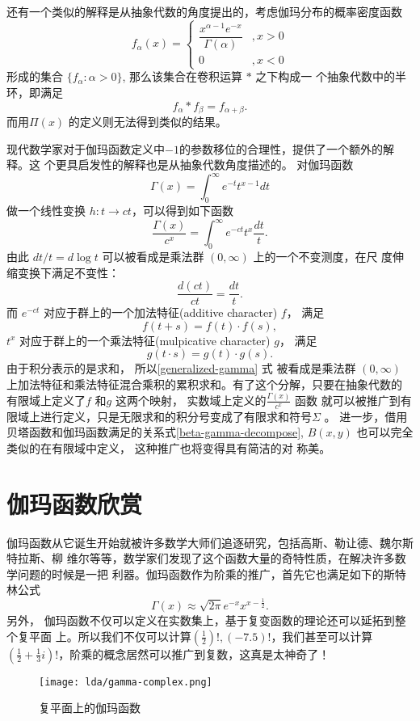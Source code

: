 {还有一个类似的解释是从抽象代数的角度提出的，考虑伽玛分布的概率密度函数
$$ f_\alpha(x)=\begin{cases} \dfrac{x^{\alpha-1} e^{-x}}{\Gamma(\alpha)} 
& , x>0 \\[12pt] 0 & , x<0 \end{cases} $$
形成的集合 $\{f_\alpha : \alpha > 0\}$, 那么该集合在卷积运算 $*$ 之下构成一
个抽象代数中的半环，即满足
$$ f_\alpha * f_\beta = f_{\alpha+\beta} .$$
而用$\Pi(x)$ 的定义则无法得到类似的结果。 


现代数学家对于伽玛函数定义中$-1$的参数移位的合理性，提供了一个额外的解释。这
个更具启发性的解释也是从抽象代数角度描述的。 对伽玛函数
$$ \Gamma(x) = \int_0^{\infty} e^{-t}t^{x-1}dt $$
做一个线性变换 $h: t \rightarrow ct$，可以得到如下函数
\begin{equation}
\label{generalized-gamma}
\frac{\Gamma(x)}{c^x}  = \int_0^{\infty} e^{-ct} t^x \frac{dt}{t} . 
\end{equation}
由此 $dt/t = d \log t$ 可以被看成是乘法群 $(0, \infty)$ 上的一个不变测度，在尺
度伸缩变换下满足不变性：
$$ \frac{d(ct)}{ct} = \frac{dt}{t} .$$
而 $e^{-ct}$ 对应于群上的一个加法特征(additive character) $f$， 满足 
$$f(t+s) =f(t) \cdot f(s) ,$$ 
$t^x$ 对应于群上的一个乘法特征(mulpicative character) $g$， 满足
$$g(t \cdot s) = g(t) \cdot g(s) .$$
由于积分表示的是求和， 所以\eqref{generalized-gamma} 式 被看成是乘法群 $(0,
\infty)$ 上加法特征和乘法特征混合乘积的累积求和。有了这个分解，只要在抽象代数的
有限域上定义了$f$ 和$g$ 这两个映射， 实数域上定义的$\frac{\Gamma(x)}{c^x}$ 函数
就可以被推广到有限域上进行定义，只是无限求和的积分号变成了有限求和符号$\Sigma$
。 进一步，借用贝塔函数和伽玛函数满足的关系式\eqref{beta-gamma-decompose},
$B(x,y)$ 也可以完全类似的在有限域中定义， 这种推广也将变得具有简洁的对
称美。


\section{伽玛函数欣赏}

伽玛函数从它诞生开始就被许多数学大师们追逐研究，包括高斯、勒让德、魏尔斯特拉斯、柳
维尔等等，数学家们发现了这个函数大量的奇特性质，在解决许多数学问题的时候是一把
利器。伽玛函数作为阶乘的推广，首先它也满足如下的斯特林公式
$$ \Gamma(x) \approx \sqrt{2\pi}e^{-x}x^{x-\frac{1}{2}} .$$
另外， 伽玛函数不仅可以定义在实数集上，基于复变函数的理论还可以延拓到整个复平面
上。所以我们不仅可以计算$ (\frac{1}{2})!, (-7.5)!$，我们甚至可以计算
$(\frac{1}{2} + \frac{1}{3}i)!$，阶乘的概念居然可以推广到复数，这真是太神奇了！ 
\begin{figure}[H]
\centering
\texttt{[image: lda/gamma-complex.png]}
\caption{复平面上的伽玛函数}
\end{figure}

}
